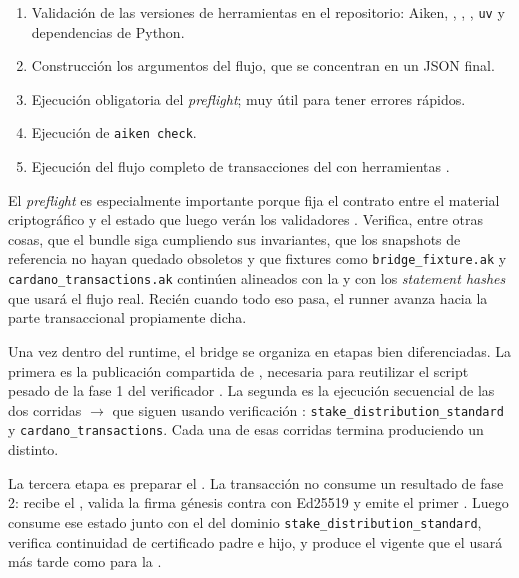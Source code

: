 \begin{enumerate}[noitemsep]
  \item Validación de las versiones de herramientas en el repositorio: Aiken, \Trix, \CShell, \Dolos, \texttt{uv} y dependencias de Python.
  \item Construcción los argumentos \STM del flujo, que se concentran en un JSON final.
  \item Ejecución obligatoria del \textit{preflight}; muy útil para tener errores rápidos.
  \item Ejecución de \texttt{aiken check}.
  \item Ejecución del flujo completo de transacciones del \zkBridge con herramientas \TxThree.
\end{enumerate}

El \textit{preflight} es especialmente importante porque fija el contrato entre el material criptográfico \Offchain y el estado que luego verán los validadores \Onchain. Verifica, entre otras cosas, que el bundle \STM siga cumpliendo sus invariantes, que los snapshots de referencia no hayan quedado obsoletos y que fixtures como \texttt{bridge\_fixture.ak} y \texttt{cardano\_transactions.ak} continúen alineados con la \TxSetRoot y con los \textit{statement hashes} que usará el flujo real. Recién cuando todo eso pasa, el runner avanza hacia la parte transaccional propiamente dicha.

Una vez dentro del runtime, el bridge se organiza en etapas bien diferenciadas. La primera es la publicación compartida de \PublishPhaseOneReferenceScriptTx, necesaria para reutilizar el script pesado de la fase 1 del verificador \STM. La segunda es la ejecución secuencial de las dos corridas \PhaseOneSetupTx $\rightarrow$ \PhaseTwoVerifyTx que siguen usando verificación \HaloTwo \Onchain: \texttt{stake\_distribution\_standard} y \texttt{cardano\_transactions}. Cada una de esas corridas termina produciendo un \ProofReceipt distinto.

La tercera etapa es preparar el \StakeDistributionUTxO. La transacción \StakeDistributionGenesisTxTemplate no consume un resultado de fase 2: recibe el \GenesisCertificate, valida la firma génesis \GenesisSignature contra \GenesisVerificationKey con Ed25519 y emite el primer \StakeDistributionUTxO. Luego \StakeDistributionStandardTxTemplate consume ese estado junto con el \ProofReceipt del dominio \texttt{stake\_distribution\_standard}, verifica continuidad de certificado padre e hijo, y produce el \StakeDistributionUTxO vigente que el \zkBridge usará más tarde como \ReferenceInput para la \MintTx.

